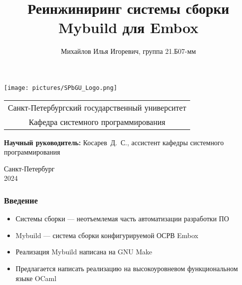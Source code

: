 \documentclass{beamer}
\title[Реинжиниринг Mybuild]{Реинжиниринг системы сборки Mybuild для Embox}
\institute[СПбГУ]{}
\author[Михайлов Илья]{Михайлов Илья Игоревич, группа 21.Б07-мм}
\begin{document}
{
\begin{frame}
	\texttt{[image: pictures/SPbGU\_Logo.png]}
	\vspace{-35pt}
	\hspace{-10pt}
	\begin{center}
		\begin{tabular}{c}
			\scriptsize{Санкт-Петербургский государственный университет} \\
			\scriptsize{Кафедра системного программирования}
		\end{tabular}
		\titlepage
	\end{center}

	\btVFill

	{\scriptsize
		\textbf{Научный руководитель:} Косарев~Д.~С., ассистент кафедры системного программирования \\
	}
	\begin{center}
		\vspace{5pt}
		\scriptsize{Санкт-Петербург\\
			2024}
	\end{center}

\end{frame}
}

\begin{frame}[fragile]
	\frametitle{Введение}
	\begin{itemize}
		\item Системы сборки --- неотъемлемая часть автоматизации разработки ПО
		\item Mybuild --- система сборки конфигурируемой ОСРВ Embox
		\item Реализация Mybuild написана на GNU Make
		\item Предлагается написать реализацию на высокоуровневом функциональном языке OCaml
	\end{itemize}
\end{frame}
\end{document}
